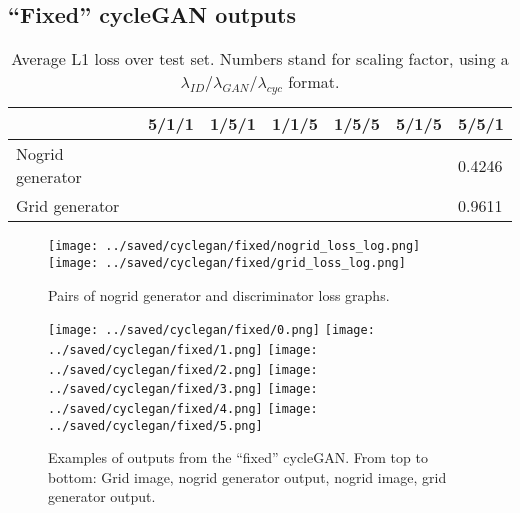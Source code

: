 \subsection{``Fixed'' cycleGAN outputs}

\begin{table}[H]
  \centering
  \begin{tabular}{|l|l|l|l|l|l|l|}
    \hline
                     & 5/1/1  & 1/5/1  & 1/1/5  & 1/5/5  & 5/1/5  & 5/5/1  \\ \hline
    Nogrid generator &  &  &  &  &  & 0.4246 \\ \hline
    Grid generator   &  &  &  &  &  & 0.9611 \\ \hline
  \end{tabular}
  \caption{Average L1 loss over test set. Numbers stand for scaling factor, using a $\lambda_{ID}/\lambda_{GAN}/\lambda_{cyc}$ format.}\label{fig:cyclegan_fixed_perf}
\end{table}

\begin{figure}[H]
  \centering
  \captionsetup{justification=centering}
  \texttt{[image: ../saved/cyclegan/fixed/nogrid\_loss\_log.png]}
  \texttt{[image: ../saved/cyclegan/fixed/grid\_loss\_log.png]}
  \caption{Pairs of nogrid generator and discriminator loss graphs.}\label{image:cyclegan_fixed_loss}
\end{figure}

\begin{figure}[H]
  \centering
  \captionsetup{justification=centering}
  \texttt{[image: ../saved/cyclegan/fixed/0.png]}
  \texttt{[image: ../saved/cyclegan/fixed/1.png]}
  \texttt{[image: ../saved/cyclegan/fixed/2.png]}
  \texttt{[image: ../saved/cyclegan/fixed/3.png]}
  \texttt{[image: ../saved/cyclegan/fixed/4.png]}
  \texttt{[image: ../saved/cyclegan/fixed/5.png]}
  \caption[center]{Examples of outputs from the ``fixed'' cycleGAN. From top to bottom: Grid image, nogrid generator output, nogrid image, grid generator output.}\label{image:cyclegan_fixed_images}
\end{figure}
